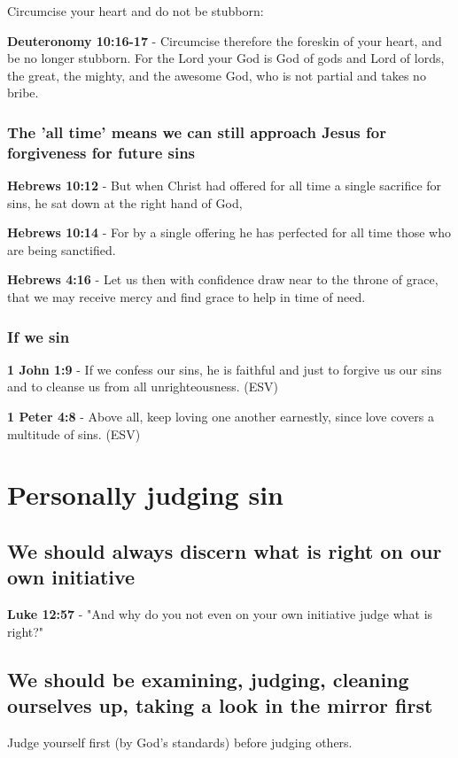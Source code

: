 \documentclass[11pt]{article}
\begin{document}
Circumcise your heart and do not be stubborn:

\textbf{Deuteronomy 10:16-17} - Circumcise therefore the foreskin of your heart, and be no longer stubborn. For the Lord your God is God of gods and Lord of lords, the great, the mighty, and the awesome God, who is not partial and takes no bribe.

\subsubsection{The 'all time' means we can still approach Jesus for forgiveness for future sins}
\label{sec:org7f72eaa}
\textbf{Hebrews 10:12} - But when Christ had offered for all time a single sacrifice for sins, he sat down at the right hand of God,

\textbf{Hebrews 10:14} - For by a single offering he has perfected for all time those who are being sanctified.

\textbf{Hebrews 4:16} - Let us then with confidence draw near to the throne of grace, that we may receive mercy and find grace to help in time of need.

\subsubsection{If we sin}
\label{sec:org454dece}
\textbf{1 John 1:9} -  If we confess our sins, he is faithful and just to forgive us our sins and to cleanse us from all unrighteousness.  (ESV)

\textbf{1 Peter 4:8} -  Above all, keep loving one another earnestly, since love covers a multitude of sins.  (ESV)

\section{Personally judging sin}
\label{sec:orgf7d2300}
\subsection{We should always discern what is right on our own initiative}
\label{sec:orga5c8cee}
\textbf{Luke 12:57} - "And why do you not even on your own initiative judge what is right?"

\subsection{We should be examining, judging, cleaning ourselves up, taking a look in the mirror first}
\label{sec:org1c6569c}
Judge yourself first (by God's standards) before judging others.
\end{document}
